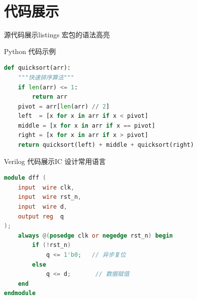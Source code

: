 \documentclass[UTF8,11pt,aspectratio=169]{beamer}
\begin{document}
\section{代码展示}

\begin{frame}[fragile]{源代码展示}{listings 宏包的语法高亮}
    \begin{block}{Python 代码示例}
        \begin{lstlisting}[language=Python,
            caption={快速排序实现},
            label={lst:quicksort}]
def quicksort(arr):
    """快速排序算法"""
    if len(arr) <= 1:
        return arr
    pivot = arr[len(arr) // 2]
    left  = [x for x in arr if x < pivot]
    middle = [x for x in arr if x == pivot]
    right = [x for x in arr if x > pivot]
    return quicksort(left) + middle + quicksort(right)
        \end{lstlisting}
    \end{block}
\end{frame}

\begin{frame}[fragile]{Verilog 代码展示}{IC 设计常用语言}
    \begin{lstlisting}[language=Verilog,
        caption={D 触发器 Verilog 实现},
        label={lst:dff}]
module dff (
    input  wire clk,
    input  wire rst_n,
    input  wire d,
    output reg  q
);
    always @(posedge clk or negedge rst_n) begin
        if (!rst_n)
            q <= 1'b0;   // 异步复位
        else
            q <= d;       // 数据赋值
    end
endmodule
    \end{lstlisting}
\end{frame}
\end{document}
